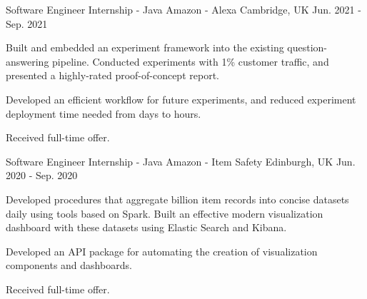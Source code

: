 \begin{cventries}
  \cventry
    {Software Engineer Internship - Java} %
    {Amazon - Alexa} %
    {Cambridge, UK} %
    {Jun. 2021 - Sep. 2021} %
    {
      \begin{cvitems} %
        \item {Built and embedded an experiment framework into the existing question-answering pipeline. Conducted experiments with 1\% customer traffic, and presented a highly-rated proof-of-concept report.}
        \item {Developed an efficient workflow for future experiments, and reduced experiment deployment time needed from days to hours.}
        \item {Received full-time offer.}
      \end{cvitems}
    }

  \cventry
    {Software Engineer Internship - Java} %
    {Amazon - Item Safety} %
    {Edinburgh, UK} %
    {Jun. 2020 - Sep. 2020} %
    {
      \begin{cvitems} %
        \item {Developed procedures that aggregate  billion item records into concise datasets daily using tools based on Spark. Built an effective modern visualization dashboard with these datasets using Elastic Search and Kibana.}
        \item {Developed an API package for automating the creation of visualization components and dashboards.}
        \item {Received full-time offer.}
      \end{cvitems}
    }


\end{cventries}
